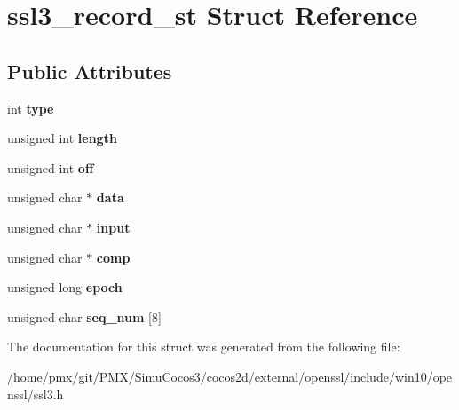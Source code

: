 \hypertarget{structssl3__record__st}{}\section{ssl3\+\_\+record\+\_\+st Struct Reference}
\label{structssl3__record__st}
\subsection*{Public Attributes}
\begin{DoxyCompactItemize}
\item 
\mbox{\label{structssl3__record__st_a51d0757184a963149122f4c020897002}} 
int {\bfseries type}
\item 
\mbox{\label{structssl3__record__st_ac7ca2fdc9d81e439c02b314c3f6b44e0}} 
unsigned int {\bfseries length}
\item 
\mbox{\label{structssl3__record__st_a6e1645baa9d3a07247d82d15cf54498a}} 
unsigned int {\bfseries off}
\item 
\mbox{\label{structssl3__record__st_af6fe1b3b1e64483b05e1ede9e19607d2}} 
unsigned char $\ast$ {\bfseries data}
\item 
\mbox{\label{structssl3__record__st_aa3a1dee09fd5b0a2732d43cfd81850b8}} 
unsigned char $\ast$ {\bfseries input}
\item 
\mbox{\label{structssl3__record__st_a887d4ab9a66dbea8ff63648d9baa42cb}} 
unsigned char $\ast$ {\bfseries comp}
\item 
\mbox{\label{structssl3__record__st_a52c7ebb11114cf6efca3bbe70a7e0c31}} 
unsigned long {\bfseries epoch}
\item 
\mbox{\label{structssl3__record__st_ab6ec6fd50c32c24851277e3e5f70f38f}} 
unsigned char {\bfseries seq\+\_\+num} \mbox{[}8\mbox{]}
\end{DoxyCompactItemize}


The documentation for this struct was generated from the following file\+:\begin{DoxyCompactItemize}
\item 
/home/pmx/git/\+P\+M\+X/\+Simu\+Cocos3/cocos2d/external/openssl/include/win10/openssl/ssl3.\+h\end{DoxyCompactItemize}
